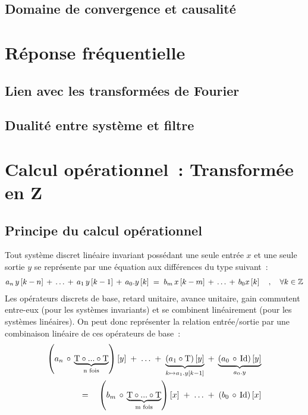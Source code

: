 \subsection{Domaine de convergence et causalité}

\section{Réponse fréquentielle}
\subsection{Lien avec les transformées de Fourier}
\subsection{Dualité entre système et filtre}



\section{Calcul opérationnel~: Transformée en Z}


\subsection{Principe du calcul opérationnel}
\label{sec:calcul_operationnel}
Tout système discret linéaire invariant possédant une seule entrée $x$ et
une seule sortie $y$ se représente par une équation aux différences du
type suivant~:
\begin{eqnarray}
  \label{eq:systeme_recurrence}
  a_n\,y\left[k-n\right] \,+\, \ldots  \,+\,  a_1\,y\left[k-1\right] \,+\, a_0.y\left[k\right] \;=\; b_m\,x\left[k-m\right] \,+\, \ldots \,+\, b_0 x\left[k\right] \quad,\quad \forall k\in\mathbb{Z}
\end{eqnarray}
Les opérateurs discrets de base, retard unitaire, avance unitaire,
gain commutent entre-eux (pour les systèmes invariants) et se combinent
linéairement (pour les systèmes linéaires). On peut donc représenter la
relation entrée/sortie par une combinaison linéaire de ces opérateurs
de base~:
\begin{eqnarray}
  \label{eq:systeme_operationnel}
  \left(a_n\,\circ\,\underbrace{\mathrm{T}\circ...\circ \mathrm{T}}_{\text{n fois}}\right)\left[y\right]\; +\; \ldots \;+\; \underbrace{\left(a_1\circ\mathrm{T}\right)\left[y\right]}_{k\mapsto a_1.y\left[k-1\right]} \;+\; \underbrace{\left(a_0 \,\circ\, \mathrm{Id}\right)\left[y\right]}_{a_0.y} \\
  =\quad \left(b_m\,\circ\,\underbrace{\mathrm{T}\circ...\circ \mathrm{T}}_{\text{m fois}}\right)\left[x\right] \;+\; \ldots \;+\; \left(b_0 \,\circ\,\mathrm{Id}\right)\left[x\right]
\end{eqnarray}

